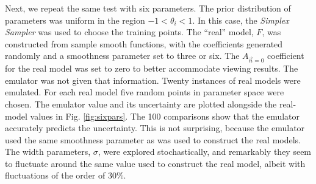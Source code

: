 \documentclass[UserManual.tex]{subfiles}
\begin{document}
Next, we repeat the same test with six parameters. The prior distribution of parameters was uniform in the region $-1<\theta_i<1$. In this case, the {\it Simplex Sampler} was used to choose the training points. The ``real'' model, $F$, was constructed from sample smooth functions, with the coefficients generated randomly and a smoothness parameter set to three or six. The $A_{\vec{n}=0}$ coefficient for the real model was set to zero to better accommodate viewing results. The emulator was not given that information. Twenty instances of real models were emulated. For each real model five random points in parameter space were chosen. The emulator value and its uncertainty are plotted alongside the real-model values in Fig. \ref{fig:sixpars}. The 100 comparisons show that the emulator accurately predicts the uncertainty. This is not surprising, because the emulator used the same smoothness parameter as was used to construct the real models. The width parameters, $\sigma$, were explored stochastically, and remarkably they seem to fluctuate around the same value used to construct the real model, albeit with fluctuations of the order of 30\%. 
\end{document}
